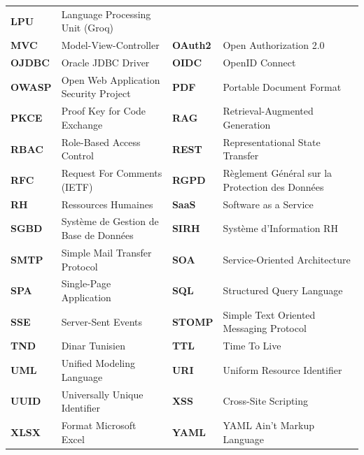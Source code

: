 {\begin{tabularx}{\textwidth}{>{\bfseries}p{1.5cm} X >{\bfseries}p{1.5cm} X}
LPU   & Language Processing Unit (Groq) \\
MVC   & Model-View-Controller &
OAuth2 & Open Authorization 2.0 \\
OJDBC & Oracle JDBC Driver &
OIDC  & OpenID Connect \\
OWASP & Open Web Application Security Project &
PDF   & Portable Document Format \\
PKCE  & Proof Key for Code Exchange &
RAG   & Retrieval-Augmented Generation \\
RBAC  & Role-Based Access Control &
REST  & Representational State Transfer \\
RFC   & Request For Comments (IETF) &
RGPD  & Règlement Général sur la Protection des Données \\
RH    & Ressources Humaines &
SaaS  & Software as a Service \\
SGBD  & Système de Gestion de Base de Données &
SIRH  & Système d'Information RH \\
SMTP  & Simple Mail Transfer Protocol &
SOA   & Service-Oriented Architecture \\
SPA   & Single-Page Application &
SQL   & Structured Query Language \\
SSE   & Server-Sent Events &
STOMP & Simple Text Oriented Messaging Protocol \\
TND   & Dinar Tunisien &
TTL   & Time To Live \\
UML   & Unified Modeling Language &
URI   & Uniform Resource Identifier \\
UUID  & Universally Unique Identifier &
XSS   & Cross-Site Scripting \\
XLSX  & Format Microsoft Excel &
YAML  & YAML Ain't Markup Language \\
\end{tabularx}
}
\endgroup
